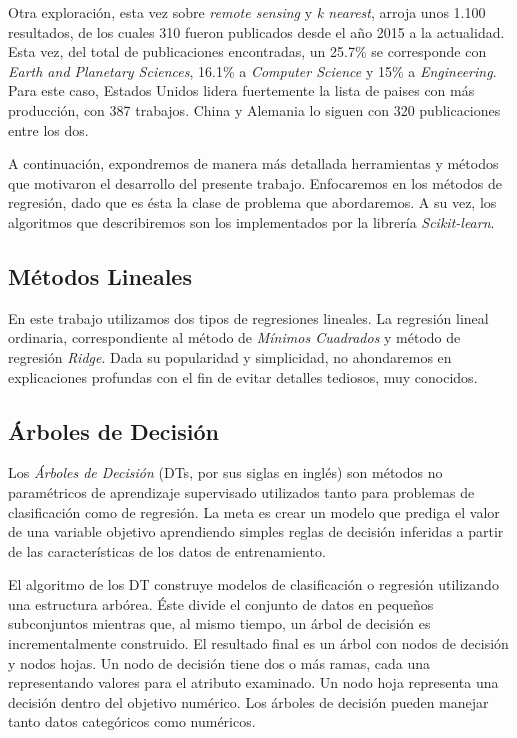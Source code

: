     \par Otra exploración, esta vez sobre \textit{remote sensing} y \textit{k nearest},
      arroja unos 1.100 resultados, de los cuales 310 fueron publicados desde
      el año 2015 a la actualidad. Esta vez, del total de publicaciones encontradas,
      un 25.7\% se corresponde con \textit{Earth and Planetary Sciences}, 16.1\%
      a \textit{Computer Science} y 15\% a \textit{Engineering}. Para este caso,
      Estados Unidos lidera fuertemente la lista de paises con más producción,
      con 387 trabajos. China y Alemania lo siguen con 320 publicaciones entre
      los dos.


    \par A continuación, expondremos de manera más detallada
      herramientas y métodos que motivaron el desarrollo del presente
      trabajo. Enfocaremos en los métodos de regresión, dado que es ésta la clase
      de problema que abordaremos. A su vez, los algoritmos que describiremos son
      los implementados por la librería \textit{Scikit-learn}.


  \subsection{Métodos Lineales}

    \par En este trabajo utilizamos dos tipos de regresiones lineales. La regresión
    lineal ordinaria, correspondiente al método de \textit{Mínimos Cuadrados}\cite{least_square}
    y método de regresión \textit{Ridge}\cite{ridge}.
    Dada su popularidad y simplicidad, no ahondaremos en explicaciones profundas
    con el fin de evitar detalles tediosos, muy conocidos.


  \subsection{Árboles de Decisión}
    \par Los \textit{Árboles de Decisión} (DTs, por sus siglas en inglés)\cite{decision_tree_regression}
      son métodos no paramétricos de aprendizaje supervisado
      utilizados tanto para problemas de clasificación como de regresión.
      La meta es crear un modelo que prediga el valor de una variable objetivo aprendiendo
      simples reglas de decisión inferidas a partir de las características de los datos
      de entrenamiento.


    \par El algoritmo de los DT construye modelos de clasificación o regresión
      utilizando una estructura arbórea. Éste divide el conjunto de datos en pequeños
      subconjuntos mientras que, al mismo tiempo, un árbol de decisión es incrementalmente
      construido. El resultado final es un árbol con nodos de decisión y nodos hojas.
      Un nodo de decisión tiene dos o más ramas, cada una representando valores para
      el atributo examinado. Un nodo hoja representa una decisión dentro del
      objetivo numérico. Los árboles de decisión pueden manejar tanto datos
      categóricos como numéricos.


